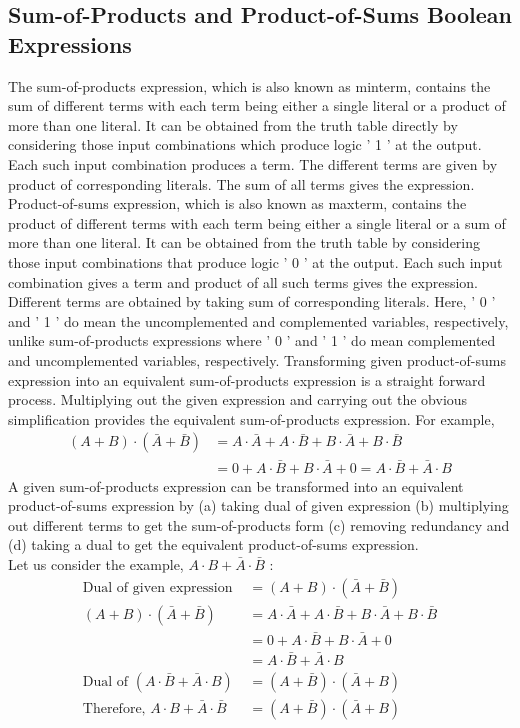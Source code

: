 \subsection{Sum-of-Products and Product-of-Sums Boolean Expressions}
The sum-of-products expression, which is also known as minterm, contains the sum of different terms with each term being either a single literal or a product of more than one literal. It can be obtained from the truth table directly by considering those input combinations which produce logic ' 1 ' at the output. Each such input combination produces a term. The different terms are given by product of corresponding literals. The sum of all terms gives the expression.
Product-of-sums expression, which is also known as maxterm, contains the product of different terms with each term being either a single literal or a sum of more than one literal. It can be obtained from the truth table by considering those input combinations that produce logic ' 0 ' at the output. Each such input combination gives a term and product of all such terms gives the expression. Different terms are obtained by taking sum of corresponding literals. Here, ' 0 ' and ' 1 ' do mean the uncomplemented and complemented variables, respectively, unlike sum-of-products expressions where ' 0 ' and ' 1 ' do mean complemented and uncomplemented variables, respectively.
Transforming given product-of-sums expression into an equivalent sum-of-products expression is a straight forward process. Multiplying out the given expression and carrying out the obvious simplification provides the equivalent sum-of-products expression. For example,
$$
\begin{aligned}
(A+B) \cdot(\bar{A}+\bar{B}) &=A \cdot \bar{A}+A \cdot \bar{B}+B \cdot \bar{A}+B \cdot \bar{B} \\
&=0+A \cdot \bar{B}+B \cdot \bar{A}+0=A \cdot \bar{B}+\bar{A} \cdot B
\end{aligned}
$$
A given sum-of-products expression can be transformed into an equivalent product-of-sums expression by (a) taking dual of given expression (b) multiplying out different terms to get the sum-of-products form (c) removing redundancy and (d) taking a dual to get the equivalent product-of-sums expression. \\Let us consider the example, $A \cdot B+\bar{A} \cdot \bar{B}$ :
$$
\begin{aligned}
\text{Dual of given expression }&=(A+B) \cdot(\bar{A}+\bar{B})\\
(A+B) \cdot(\bar{A}+\bar{B}) &=A \cdot \bar{A}+A \cdot \bar{B}+B \cdot \bar{A}+B \cdot \bar{B} \\
&=0+A \cdot \bar{B}+B \cdot \bar{A}+0\\&=A \cdot \bar{B}+\bar{A} \cdot B\\
\text{Dual of } (A \cdot \bar{B}+\bar{A} \cdot B)&=(A+\bar{B}) \cdot(\bar{A}+B)\\
\text{Therefore, } A \cdot B+\bar{A} \cdot \bar{B}&=(A+\bar{B}) \cdot(\bar{A}+B)
\end{aligned}
$$

